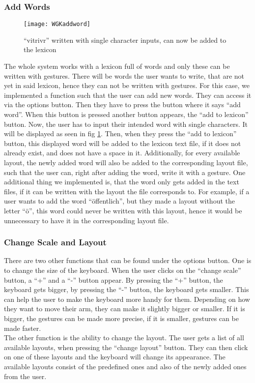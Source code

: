 \subsubsection{Add Words}
\begin{figure}
    \centering
    \texttt{[image: WGKaddword]}
    \caption{``vitrivr'' written with single character inputs, can now be added to the lexicon}
    \label{fig:addword}
\end{figure}
The whole system works with a lexicon full of words and only these can be written with gestures. There will be words the user wants to write, that are not yet in said lexicon, hence they can not be written with gestures. For this case, we implemented a function such that the user can add new words. They can access it via the options button. Then they have to press the button where it says ``add word''. When this button is pressed another button appears, the ``add to lexicon'' button. Now, the user has to input their intended word with single characters. It will be displayed as seen in fig \ref{fig:addword}. Then, when they press the ``add to lexicon'' button, this displayed word will be added to the lexicon text file, if it does not already exist, and does not have a space in it. Additionally, for every available layout, the newly added word will also be added to the corresponding layout file, such that the user can, right after adding the word, write it with a gesture. One additional thing we implemented is, that the word only gets added in the text files, if it can be written with the layout the file corresponds to. For example, if a user wants to add the word ``öffentlich'', but they made a layout without the letter ``ö'', this word could never be written with this layout, hence it would be unnecessary to have it in the corresponding layout file.

\subsubsection{Change Scale and Layout}
There are two other functions that can be found under the options button. One is to change the size of the keyboard. When the user clicks on the ``change scale'' button, a ``+'' and a ``-'' button appear. By pressing the ``+'' button, the keyboard gets bigger, by pressing the ``-'' button, the keyboard gets smaller. This can help the user to make the keyboard more handy for them. Depending on how they want to move their arm, they can make it slightly bigger or smaller. If it is bigger, the gestures can be made more precise, if it is smaller, gestures can be made faster.\\
The other function is the ability to change the layout. The user gets a list of all available layouts, when pressing the ``change layout'' button. They can then click on one of these layouts and the keyboard will change its appearance. The available layouts consist of the predefined ones and also of the newly added ones from the user.

